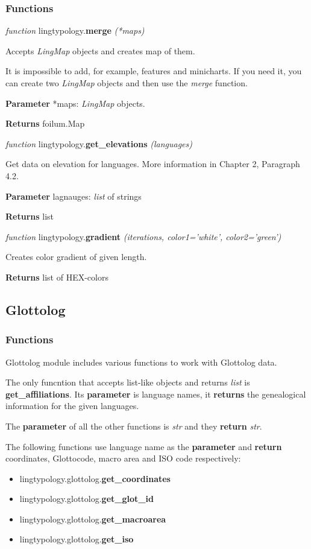 \documentclass[a4paper,12pt]{article}
\begin{document}
\subsubsection{Functions}

\textit{function} lingtypology.\textbf{merge} \textit{(*maps)}

Accepts \textit{LingMap} objects and creates map of them.

It is impossible to add, for example, features and minicharts. If you need it, you can create two \textit{LingMap} objects and then use the \textit{merge} function.

\textbf{Parameter} *maps: \textit{LingMap} objects.

\textbf{Returns} foilum.Map
\medskip

\textit{function} lingtypology.\textbf{get\_elevations} \textit{(languages)}

Get data on elevation for languages. More information in Chapter 2, Paragraph 4.2.

\textbf{Parameter} lagnauges: \textit{list} of strings

\textbf{Returns} list
\medskip

\textit{function} lingtypology.\textbf{gradient} \textit{(iterations, color1='white', color2='green')}

Creates color gradient of given length.

\textbf{Returns} list of HEX-colors

\subsection{Glottolog}

\subsubsection{Functions}
Glottolog module includes various functions to work with Glottolog data.

The only funcntion that accepts list-like objects and returns \textit{list} is \textbf{get\_affiliations}. Its \textbf{parameter} is language names, it \textbf{returns} the genealogical information for the given languages.

The \textbf{parameter} of all the other functions is \textit{str} and they \textbf{return} \textit{str}.

The following functions use language name as the \textbf{parameter} and \textbf{return} coordinates, Glottocode, macro area and ISO code respectively:
\begin{itemize}
 \item lingtypology.glottolog.\textbf{get\_coordinates}
 \item lingtypology.glottolog.\textbf{get\_glot\_id}
 \item lingtypology.glottolog.\textbf{get\_macroarea}
 \item lingtypology.glottolog.\textbf{get\_iso}
\end{itemize}
\end{document}
